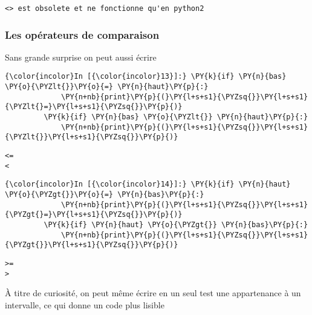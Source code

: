     \begin{Verbatim}[commandchars=\\\{\}]
<> est obsolete et ne fonctionne qu'en python2

    \end{Verbatim}

    \hypertarget{les-opuxe9rateurs-de-comparaison}{%
\subsubsection{Les opérateurs de
comparaison}\label{les-opuxe9rateurs-de-comparaison}}

    Sans grande surprise on peut aussi écrire

    \begin{Verbatim}[commandchars=\\\{\}]
{\color{incolor}In [{\color{incolor}13}]:} \PY{k}{if} \PY{n}{bas} \PY{o}{\PYZlt{}}\PY{o}{=} \PY{n}{haut}\PY{p}{:}
             \PY{n+nb}{print}\PY{p}{(}\PY{l+s+s1}{\PYZsq{}}\PY{l+s+s1}{\PYZlt{}=}\PY{l+s+s1}{\PYZsq{}}\PY{p}{)}
         \PY{k}{if} \PY{n}{bas} \PY{o}{\PYZlt{}} \PY{n}{haut}\PY{p}{:}
             \PY{n+nb}{print}\PY{p}{(}\PY{l+s+s1}{\PYZsq{}}\PY{l+s+s1}{\PYZlt{}}\PY{l+s+s1}{\PYZsq{}}\PY{p}{)}
\end{Verbatim}


    \begin{Verbatim}[commandchars=\\\{\}]
<=
<

    \end{Verbatim}

    \begin{Verbatim}[commandchars=\\\{\}]
{\color{incolor}In [{\color{incolor}14}]:} \PY{k}{if} \PY{n}{haut} \PY{o}{\PYZgt{}}\PY{o}{=} \PY{n}{bas}\PY{p}{:}
             \PY{n+nb}{print}\PY{p}{(}\PY{l+s+s1}{\PYZsq{}}\PY{l+s+s1}{\PYZgt{}=}\PY{l+s+s1}{\PYZsq{}}\PY{p}{)}
         \PY{k}{if} \PY{n}{haut} \PY{o}{\PYZgt{}} \PY{n}{bas}\PY{p}{:}
             \PY{n+nb}{print}\PY{p}{(}\PY{l+s+s1}{\PYZsq{}}\PY{l+s+s1}{\PYZgt{}}\PY{l+s+s1}{\PYZsq{}}\PY{p}{)}
\end{Verbatim}


    \begin{Verbatim}[commandchars=\\\{\}]
>=
>

    \end{Verbatim}

    À titre de curiosité, on peut même écrire en un seul test une
appartenance à un intervalle, ce qui donne un code plus lisible

